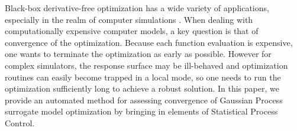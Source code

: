\documentclass[12pt]{article}
\begin{document}

%
%

Black-box derivative-free optimization has a
wide variety of applications, especially in the realm of computer
simulations \citep{KoldLewiTorc2003,gramacy2014}.  
%
When dealing with computationally expensive computer
models, a key question is that of convergence of the optimization.
%
Because each function evaluation is expensive, one wants to terminate
the optimization as early as possible.  
%
However for complex simulators, the response surface may be ill-behaved and optimization
routines can easily become trapped in a local mode, so one needs to
run the optimization sufficiently long to achieve a robust solution.
%
In this paper, we provide an automated method for assessing convergence of 
Gaussian Process surrogate model optimization by bringing in elements
of Statistical Process Control.
\end{document}
